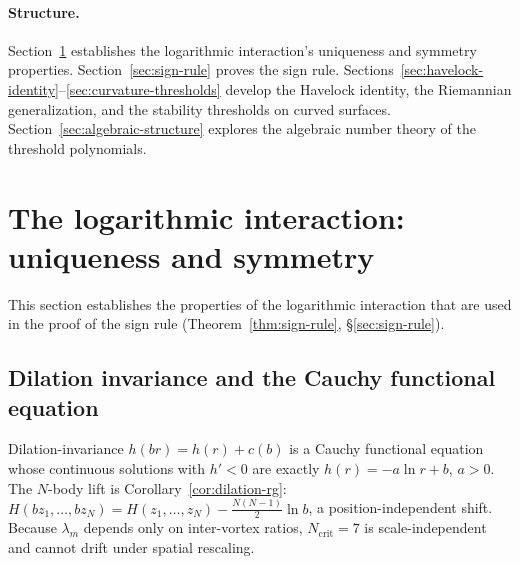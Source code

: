 \paragraph{Structure.}
Section~\ref{sec:log-interaction} establishes the logarithmic
interaction's uniqueness and symmetry properties.
Section~\ref{sec:sign-rule} proves the sign rule.
Sections~\ref{sec:havelock-identity}--\ref{sec:curvature-thresholds}
develop the Havelock identity, the Riemannian generalization, and
the stability thresholds on curved surfaces.
Section~\ref{sec:algebraic-structure} explores the algebraic number
theory of the threshold polynomials.




\section{The logarithmic interaction: uniqueness and symmetry}
\label{sec:log-interaction}

This section establishes the properties of the logarithmic interaction
that are used in the proof of the sign rule
(Theorem~\ref{thm:sign-rule}, \S\ref{sec:sign-rule}).

\subsection{Dilation invariance and the Cauchy functional equation}
\label{sec:dilation-invariance}

\begin{remark}
\label{rem:rg-fixed-point}
Dilation-invariance $h(br) = h(r) + c(b)$ is a Cauchy functional
equation whose continuous solutions with $h'<0$ are exactly
$h(r)=-a\ln r + b$, $a>0$.  The $N$-body lift is
Corollary~\ref{cor:dilation-rg}:
$H(bz_1,\dots,bz_N)=H(z_1,\dots,z_N)-\tfrac{N(N-1)}{2}\ln b$,
a position-independent shift.  Because $\lambda_m$ depends only on
inter-vortex ratios, $N_{\mathrm{crit}}=7$ is scale-independent
and cannot drift under spatial rescaling.
\end{remark}



